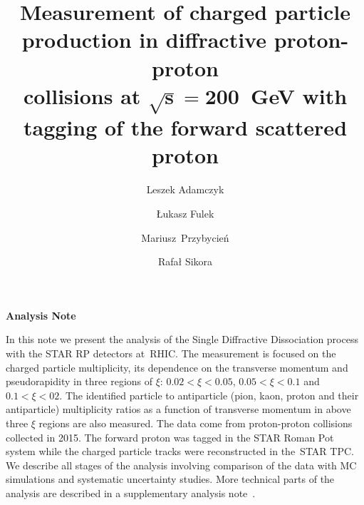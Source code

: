 \documentclass[a4paper,10pt,notitlepage]{report}
\title{\textbf{Measurement of charged particle production in diffractive proton-proton\\ collisions at $\mathbf{\sqrt{s}=200}$~GeV with tagging of the forward scattered proton}\vspace*{10pt}}
\author[1]{Leszek Adamczyk}
\author[1]{Łukasz Fulek}
\author[1]{\mbox{Mariusz Przybycień}}
\author[1]{Rafał Sikora}
\affil[1]{AGH University of Science and Technology, FPACS, Kraków, Poland}
\begin{document}
\makeatletter
\setlength{\@fptop}{0pt}
\makeatother

\begin{center}
	\textbf{\LARGE{Analysis Note}}
	
	\begin{minipage}{\linewidth}
		\maketitle
			In this note we present the analysis of the Single Diffractive Dissociation process with the STAR \ac{RP} detectors at~RHIC. The measurement is focused on the charged particle
			multiplicity, its dependence on the transverse momentum  and pseudorapidity   in  three regions of $\xi$: $0.02<\xi <0.05$, $0.05<\xi<0.1$ and $0.1<\xi<02$.  The identified particle to antiparticle (pion, kaon, proton and their antiparticle) multiplicity ratios as a function of transverse momentum in above three $\xi$ regions  are also measured. The data come from proton-proton collisions collected in 2015. The forward proton was tagged in the STAR Roman Pot system while the charged particle tracks were reconstructed in the~STAR \ac{TPC}. 
			We describe all stages of the analysis involving comparison of the data with MC simulations and systematic uncertainty studies.
			More technical parts of the analysis  are described in a supplementary analysis note~\cite{supplementaryNote}.	
		\thispagestyle{empty}
	\end{minipage}

\end{center}


\newpage








\tableofcontents
\setcounter{page}{1}



\newpage
\setcounter{page}{1}







%








\begin{appendices}
	
	
	
\end{appendices}
\end{document}
